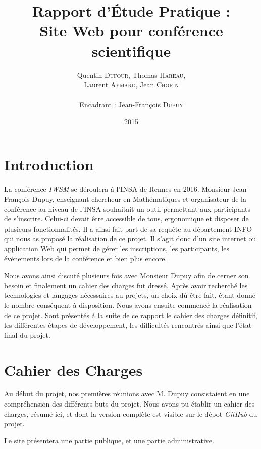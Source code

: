 \documentclass[a4paper,11pt]{article}
\title{ \textbf{Rapport d'Étude Pratique : \\
Site Web pour conférence scientifique} }
\author{Quentin \textsc{Dufour}, Thomas \textsc{Hareau}, \\
        Laurent \textsc{Aymard}, Jean \textsc{Chorin} \\
        \\
        Encadrant : Jean-François \textsc{Dupuy}}
\date{2015}                    %
\begin{document}
          

\maketitle                 %
\thispagestyle{empty}      %
\newpage


\begin{abstract}
\end{abstract} 

\newpage

\section{Introduction}  

La conférence \textit{IWSM} se déroulera à l'INSA de Rennes en 2016. Monsieur Jean-François Dupuy, enseignant-chercheur en Mathématiques et organisateur de la conférence au niveau de l'INSA souhaitait un outil permettant aux participants de s'inscrire. Celui-ci devait être accessible de tous, ergonomique et disposer de plusieurs fonctionnalités. Il a ainsi fait part de sa requête au département INFO qui nous as proposé la réalisation de ce projet. Il s'agit donc d'un site internet ou application Web qui permet de gérer les inscriptions, les participants, les événements lors de la conférence et bien plus encore.

\bigbreak
Nous avons ainsi discuté plusieurs fois avec Monsieur Dupuy afin de cerner son besoin et finalement un cahier des charges fut dressé.
Après avoir recherché les technologies et langages nécessaires au projets, un choix dû être fait, étant donné le nombre conséquent à disposition. Nous avons ensuite commencé la réalisation de ce projet. Sont présentés à la suite de ce rapport le cahier des charges définitif, les différentes étapes de développement, les difficultés rencontrés ainsi que l'état final du projet.

\section{Cahier des Charges}
Au début du projet, nos premières réunions avec M. Dupuy consistaient en une compréhension des différents buts du projet. Nous avons pu établir un cahier des charges, résumé ici, et dont la version complète est visible sur le dépot \textit{GitHub} du projet. 

\medbreak
Le site présentera une partie publique, et une partie administrative. 
\end{document}
